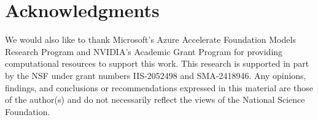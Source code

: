 \section*{Acknowledgments}
We would also like to thank Microsoft's Azure Accelerate Foundation Models Research Program and NVIDIA's Academic Grant Program for providing computational resources to support this work.  This research is supported in part by the NSF under grant numbers IIS-2052498 and SMA-2418946. Any opinions, findings, and conclusions or recommendations expressed in this material are those of the author(s) and do not necessarily reflect the views of the National Science Foundation.

